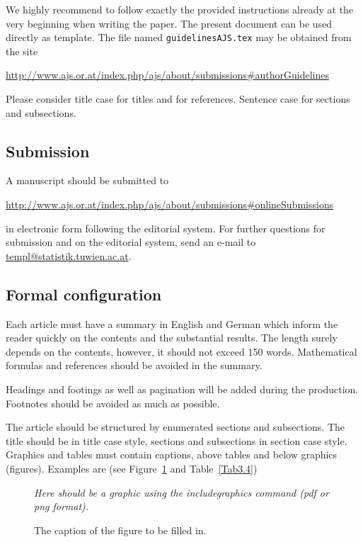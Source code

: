 \documentclass[article]{ajs}
\begin{document}
We highly recommend
to follow exactly the provided instructions already at the very
beginning when writing the paper. The present document can be used
directly as template. The file named {\tt guidelinesAJS.tex} may be
obtained from the site 

\href{http://www.ajs.or.at/index.php/ajs/about/submissions\#authorGuidelines}{http://www.ajs.or.at/index.php/ajs/about/submissions\#authorGuidelines}

Please consider title case for titles and for references. Sentence case for  sections and subsections.

\subsection{Submission}

A manuscript should be submitted to
\begin{center}
\href{http://www.ajs.or.at/index.php/ajs/about/submissions\#onlineSubmissions}{http://www.ajs.or.at/index.php/ajs/about/submissions\#onlineSubmissions}
\end{center}

in
electronic form following the editorial system. For further questions for submission and on the editorial system, send an e-mail to \href{templ@statistik.tuwien.ac.at}{templ@statistik.tuwien.ac.at}.


\subsection{Formal configuration}

Each article must have a summary in English and German which
inform the reader quickly on the contents and the substantial
results. The length surely depends on the contents, however, it
should not exceed 150 words. Mathematical formulas and references should be
avoided in the summary.

Headings and footings as well as pagination will be added during
the production. Footnotes should be avoided as much as possible.

The article should be structured by enumerated sections and
subsections. The title should be in title case style, sections and subsections in section case style. Graphics and tables must contain captions, above
tables and below graphics (figures). Examples are (see Figure~\ref{Fig3.4} and Table~\ref{Tab3.4})

\begin{figure}[hbt]
\centerline{\sl Here should be a graphic using the includegraphics command (pdf or png format).}
\caption{\label{Fig3.4}The caption of the figure to be filled in.} 
\end{figure}
\end{document}
